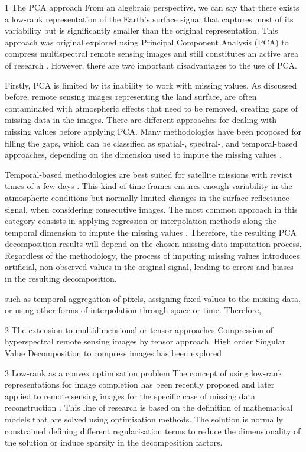 \documentclass[essd, manuscript]{copernicus}
\begin{document}
1 The PCA approach
From an algebraic perspective, we can say that there exists a low-rank representation of the Earth's surface signal that captures most of its variability but is significantly smaller than the original representation. This approach was original explored using Principal Component Analysis (PCA) to compress multispectral remote sensing images and still constitutes an active area of research \citep{du2007hyperspectral,mei2018low,bascones2018hyperspectral}. However, there are two important disadvantages to the use of PCA.

Firstly, PCA is limited by its inability to work with missing values. As discussed before, remote sensing images representing the land surface, are often contaminated with atmospheric effects that need to be removed, creating gaps of missing data in the images. There are different approaches for dealing with missing values before applying PCA. Many methodologies have been proposed for filling the gaps, which can be classified as spatial-, spectral-, and temporal-based approaches, depending on the dimension used to impute the missing values \citep{shen2015missing}. 

Temporal-based methodologies are best suited for satellite missions with revisit times of a few days \citep{shen2015missing}. This kind of time frames ensures enough variability in the atmospheric conditions but normally limited changes in the surface reflectance signal, when considering consecutive images. The most common approach in this category consists in applying regression or interpolation methods along the temporal dimension to impute the missing values \citep{zeng2013recovering,zhang2014missing,zeng2014reconstructing}. Therefore, the resulting PCA decomposition results will depend on the chosen missing data imputation process. Regardless of the methodology, the process of imputing missing values introduces artificial, non-observed values in the original signal, leading to errors and biases in the resulting decomposition.




such as temporal aggregation of pixels, assigning fixed values to the missing data, or using other forms of interpolation through space or time. Therefore, 


2 The extension to multidimensional or tensor approaches
Compression of hyperspectral remote sensing images by tensor approach. High order Singular Value Decomposition to compress images has been explored 
\citep{zhang2015compression}

3 Low-rank as a convex optimisation problem
The concept of using low-rank representations for image completion has been recently proposed \citep{long2019low} and later applied to remote sensing images for the specific case of missing data reconstruction \citep{cheng2019missing}. This line of research is based on the definition of mathematical models that are solved using optimisation methods. The solution is normally constrained defining different regularisation terms to reduce the dimensionality of the solution or induce sparsity in the decomposition factors.
\end{document}
